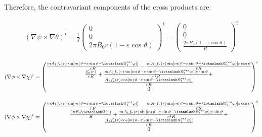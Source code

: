 \documentclass[11pt,a4paper,oneside]{article}
\makeatletter
\newcommand{\iotaslash}{{\mathpalette\iotaslash@\relax}}
\newcommand{\iotaslash@}[2]{
  \raisebox{-0.6\height}[0pt][0pt]{%
    \rotatebox[origin=Bl]{15}{$\m@th#1{\mkern-1mu\mathchar'26}$}%
  }%
  \mkern-9.5mu\nonscript\mkern-1mu
  \iota
  \mkern1mu
}
\makeatother
\begin{document}
Therefore, the contravariant components of the cross products are:

\begin{align}
(\nabla \psi \times \nabla \theta)^i = \frac{1}{J}\begin{pmatrix}0\\0\\2\pi B_0 r(1-\varepsilon \cos{\vartheta})\end{pmatrix}^i=\begin{pmatrix}0\\0\\\frac{2\pi B_0 (1-\varepsilon \cos{\vartheta})}{R}\end{pmatrix}^i
\end{align}

\begin{align}
(\nabla \phi \times \nabla \chi)^i =\begin{pmatrix}\frac{mA_1f_r(r)\sin[m(\vartheta-\varepsilon \sin{\vartheta}-\iotaslash^{res}_1\varphi)]}{rR}-\frac{mA_1f_r(r)\sin[m(\vartheta-\varepsilon \sin{\vartheta}-\iotaslash^{res}_1\varphi)]\varepsilon\cos{\vartheta}}{rR}\\\frac{\tilde{\chi}_0'(r)}{rR}+\frac{mA_1f_r(r)\sin[m(\vartheta-\varepsilon \sin{\vartheta}-\iotaslash^{res}_1\varphi)]\varepsilon \sin{\vartheta}}{r^2R}+\\
\frac{A_1f_r'(r)\cos[m(\vartheta-\varepsilon \sin{\vartheta}-\iotaslash^{res}_1\varphi)]}{rR}\\0\end{pmatrix}^i
\end{align}

\begin{align}
(\nabla \phi \times \nabla \chi)^i =\begin{pmatrix}\frac{mA_1f_r(r)\sin[m(\vartheta-\varepsilon \sin{\vartheta}-\iotaslash^{res}_1\varphi)]}{rR}-\frac{mA_1f_r(r)\sin[m(\vartheta-\varepsilon \sin{\vartheta}-\iotaslash^{res}_1\varphi)]\varepsilon\cos{\vartheta}}{rR}\\\frac{2\pi B_0\tilde{\iotaslash}(r)}{R}+\frac{mA_1f_r(r)\sin[m(\vartheta-\varepsilon \sin{\vartheta}-\iotaslash^{res}_1\varphi)]\varepsilon \sin{\vartheta}}{r^2R}+\\
\frac{A_1f_r'(r)\cos[m(\vartheta-\varepsilon \sin{\vartheta}-\iotaslash^{res}_1\varphi)]}{rR}\\0\end{pmatrix}^i
\end{align}
\end{document}
